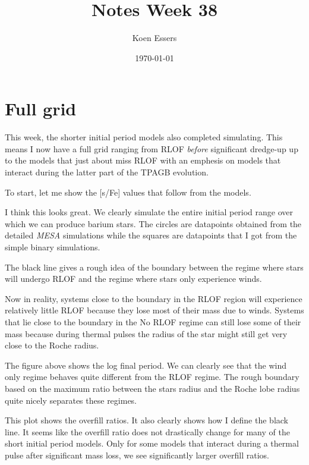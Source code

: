 \documentclass[a4paper,11pt]{article}
\title{Notes Week 38}
\author{Koen Essers}
\date{\today}
\begin{document}
\setuplayout
\section{Full grid}

This week, the shorter initial period models also completed simulating.
This means I now have a full grid ranging from RLOF \emph{before} significant dredge-up up to the models that just about miss RLOF with an emphesis on models that interact during the latter part of the TPAGB evolution.

To start, let me show the [s/Fe] values that follow from the models.

\begin{figure}[ht]
	\centering
\end{figure}

I think this looks great.
We clearly simulate the entire initial period range over which we can
produce barium stars.
The circles are datapoints obtained from the detailed \emph{MESA} simulations while the
squares are datapoints that I got from the simple binary simulations.

The black line gives a rough idea of the boundary between the regime where stars will undergo RLOF and
the regime where stars only experience winds.

Now in reality, systems close to the boundary in the RLOF region will experience relatively little RLOF because
they lose most of their mass due to winds.
Systems that lie close to the boundary in the No RLOF regime can still lose some of their mass because
during thermal pulses the radius of the star might still get very close to the Roche radius.

\begin{figure}[ht]
	\centering
\end{figure}

The figure above shows the log final period.
We can clearly see that the wind only regime
behaves quite different from the RLOF regime.
The rough boundary based on the maximum ratio between the
stars radius and the Roche lobe radius quite nicely separates these regimes.

\begin{figure}[ht]
	\centering
\end{figure}

This plot shows the overfill ratios.
It also clearly shows how I define the black line.
It seems like the overfill ratio does not drastically change for many of the short initial period
models.
Only for some models that interact during a thermal pulse after significant mass loss, we see significantly
larger overfill ratios.
\end{document}
